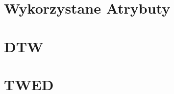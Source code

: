 \documentclass{pracalicmgr}
\begin{document}
    \begin{appendices}
        \section{Wykorzystane Atrybuty}\label{appendix:features}
        \section{DTW}\label{appendix:code-1}
        \section{TWED}\label{appendix:code-2}
    \end{appendices}
\end{document}
